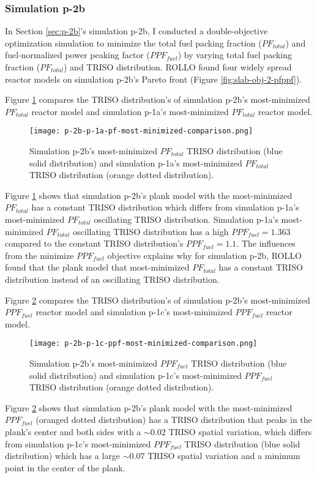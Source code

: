 \subsubsection{Simulation p-2b}
In Section \ref{sec:p-2b}'s simulation p-2b, I conducted a double-objective 
optimization simulation to minimize the total fuel packing fraction ($PF_{total}$) and 
fuel-normalized power peaking factor ($PPF_{fuel}$) by varying total fuel 
packing fraction ($PF_{total}$) and TRISO distribution. 
\gls{ROLLO} found four widely spread reactor models on simulation p-2b's Pareto 
front (Figure \ref{fig:slab-obj-2-pfppf}). 

Figure \ref{fig:p-2b-pf-triso-comparison} compares the TRISO distribution's of 
simulation p-2b's most-minimized $PF_{total}$ reactor model and simulation p-1a's 
most-minimized $PF_{total}$ reactor model. 
\begin{figure}[htbp!]
    \centering
    \texttt{[image: p-2b-p-1a-pf-most-minimized-comparison.png]} 
    \caption{Simulation p-2b's most-minimized $PF_{total}$ TRISO distribution (blue 
    solid distribution) and simulation p-1a's most-minimized $PF_{total}$ TRISO 
    distribution (orange dotted distribution).}
    \label{fig:p-2b-pf-triso-comparison}
\end{figure}
Figure \ref{fig:p-2b-pf-triso-comparison} shows that simulation p-2b's plank model 
with the most-minimized $PF_{total}$ has a constant TRISO distribution which differs 
from simulation p-1a's most-minimized $PF_{total}$ oscillating TRISO distribution. 
Simulation p-1a's most-minimized $PF_{total}$ oscillating TRISO distribution has a 
high $PPF_{fuel} = 1.363$ compared to the constant TRISO distribution's 
$PPF_{fuel} = 1.1$.
The influences from the minimize $PPF_{fuel}$ objective explains why for simulation p-2b, 
\gls{ROLLO} found that the plank model that most-minimized $PF_{total}$ has a 
constant TRISO distribution instead of an oscillating TRISO distribution.

Figure \ref{fig:p-2b-ppf-triso-comparison} compares the TRISO distribution's of 
simulation p-2b's most-minimized $PPF_{fuel}$ reactor model and simulation p-1c's 
most-minimized $PPF_{fuel}$ reactor model. 
\begin{figure}[htbp!]
    \centering
    \texttt{[image: p-2b-p-1c-ppf-most-minimized-comparison.png]} 
    \caption{Simulation p-2b's most-minimized $PPF_{fuel}$ TRISO distribution (blue 
    solid distribution) and simulation p-1c's most-minimized $PPF_{fuel}$ TRISO 
    distribution (orange dotted distribution).}
    \label{fig:p-2b-ppf-triso-comparison}
\end{figure}
Figure \ref{fig:p-2b-ppf-triso-comparison} shows that simulation p-2b's plank model 
with the most-minimized $PPF_{fuel}$ (oranged dotted distribution) has a TRISO 
distribution that peaks in the plank's center and both sides with a ${\sim}0.02$ 
TRISO spatial variation, which differs from simulation p-1c's most-minimized 
$PPF_{fuel}$ TRISO distribution (blue solid distribution) which has a 
large ${\sim} 0.07$ TRISO spatial variation and a minimum point in the center of the 
plank.

